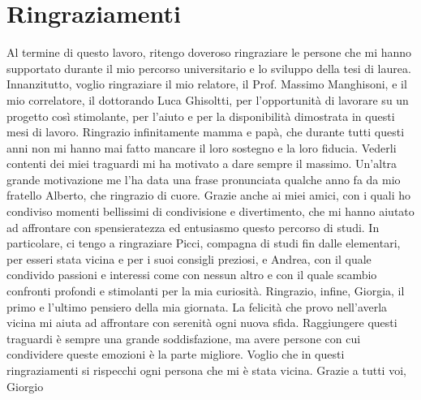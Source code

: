 \newpage
\mbox{}
\chapter*{Ringraziamenti}
Al termine di questo lavoro, ritengo doveroso ringraziare le persone che mi hanno supportato durante il mio percorso universitario e lo 
sviluppo della tesi di laurea.
\newline \newline Innanzitutto, voglio ringraziare il mio relatore, il Prof. Massimo Manghisoni, e il mio correlatore, il dottorando Luca Ghisoltti, per 
l'opportunità di lavorare su un progetto così stimolante, per l'aiuto e per la disponibilità dimostrata in questi mesi di lavoro.
\newline \newline Ringrazio infinitamente mamma e papà, che durante tutti questi anni non mi hanno mai fatto mancare il loro sostegno e la loro fiducia. 
Vederli contenti dei miei traguardi mi ha motivato a dare sempre il massimo. Un'altra grande motivazione me l'ha data una frase pronunciata 
qualche anno fa da mio fratello Alberto, che ringrazio di cuore.
\newline \newline Grazie anche ai miei amici, con i quali ho condiviso momenti bellissimi di condivisione e divertimento, che mi hanno aiutato ad affrontare 
con spensieratezza ed entusiasmo questo percorso di studi. In particolare, ci tengo a ringraziare Picci, compagna di studi fin dalle 
elementari, per esseri stata vicina e per i suoi consigli preziosi, e Andrea, con il quale condivido passioni e interessi come con 
nessun altro e con il quale scambio confronti profondi e stimolanti per la mia curiosità.
\newline \newline Ringrazio, infine, Giorgia, il primo e l'ultimo pensiero della mia giornata. La felicità che provo nell'averla vicina mi aiuta ad affrontare 
con serenità ogni nuova sfida.
\newline \newline Raggiungere questi traguardi è sempre una grande soddisfazione, ma avere persone con cui condividere queste emozioni è la parte 
migliore. Voglio che in questi ringraziamenti si rispecchi ogni persona che mi è stata vicina.
\newline \newline Grazie a tutti voi,
\newline Giorgio